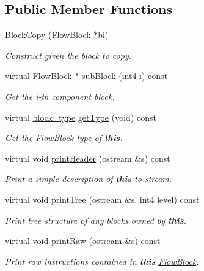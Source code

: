 \subsection*{Public Member Functions}
\begin{DoxyCompactItemize}
\item 
\mbox{\hyperlink{class_block_copy_a42de49a21f0e580fec1502993f0fb741}{Block\+Copy}} (\mbox{\hyperlink{class_flow_block}{Flow\+Block}} $\ast$bl)
\begin{DoxyCompactList}\small\item\em Construct given the block to copy. \end{DoxyCompactList}\item 
virtual \mbox{\hyperlink{class_flow_block}{Flow\+Block}} $\ast$ \mbox{\hyperlink{class_block_copy_ae8eff265a0d9da347eda0042796c058b}{sub\+Block}} (int4 i) const
\begin{DoxyCompactList}\small\item\em Get the i-\/th component block. \end{DoxyCompactList}\item 
virtual \mbox{\hyperlink{class_flow_block_a70df78390870fcdd51e31426ba6a193e}{block\+\_\+type}} \mbox{\hyperlink{class_block_copy_aab8dda53eba113d624cbd3b22b0c58c1}{get\+Type}} (void) const
\begin{DoxyCompactList}\small\item\em Get the \mbox{\hyperlink{class_flow_block}{Flow\+Block}} type of {\bfseries{this}}. \end{DoxyCompactList}\item 
virtual void \mbox{\hyperlink{class_block_copy_aa360ee1fda40a1cb2289cb92e615fb9c}{print\+Header}} (ostream \&s) const
\begin{DoxyCompactList}\small\item\em Print a simple description of {\bfseries{this}} to stream. \end{DoxyCompactList}\item 
virtual void \mbox{\hyperlink{class_block_copy_ac44129ef866b5e09769f7962c1da928c}{print\+Tree}} (ostream \&s, int4 level) const
\begin{DoxyCompactList}\small\item\em Print tree structure of any blocks owned by {\bfseries{this}}. \end{DoxyCompactList}\item 
virtual void \mbox{\hyperlink{class_block_copy_aa648abadc84c98ba2d49902f9faac957}{print\+Raw}} (ostream \&s) const
\begin{DoxyCompactList}\small\item\em Print raw instructions contained in {\bfseries{this}} \mbox{\hyperlink{class_flow_block}{Flow\+Block}}. \end{DoxyCompactList}\item 

\end{DoxyCompactItemize}
